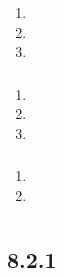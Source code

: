 \hypertarget{section-59}{%
\subsubsection{}\label{section-59}}

\begin{enumerate}
\def\labelenumi{\arabic{enumi}.}
\tightlist
\item
\item
\item
\end{enumerate}

\hypertarget{section-60}{%
\subsubsection{}\label{section-60}}

\begin{enumerate}
\def\labelenumi{\arabic{enumi}.}
\tightlist
\item
\item
\item
\end{enumerate}

\hypertarget{section-61}{%
\subsubsection{}\label{section-61}}

\begin{enumerate}
\def\labelenumi{\arabic{enumi}.}
\tightlist
\item
\item
\end{enumerate}

\hypertarget{section-62}{%
\subsection{}\label{section-62}}

\hypertarget{section-63}{%
\section{}\label{section-63}}

\hypertarget{section-64}{%
\subsection{}\label{section-64}}

\hypertarget{section-65}{%
\subsection{8.2.1}\label{section-65}}

